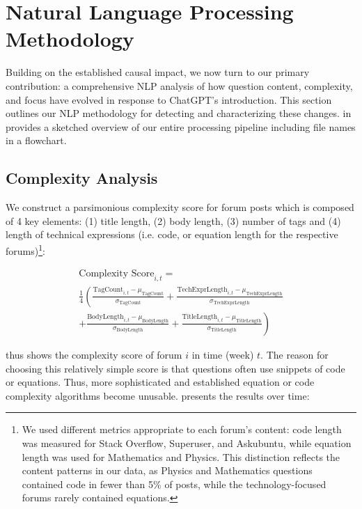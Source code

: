 \section{Natural Language Processing Methodology}
\label{sec:nlp_methodology}

Building on the established causal impact, we now turn to our primary contribution: a comprehensive NLP analysis of how question content, complexity, and focus have evolved in response to ChatGPT's introduction. This section outlines our NLP methodology for detecting and characterizing these changes.  in  provides a sketched overview of our entire processing pipeline including file names in a flowchart.


\subsection{Complexity Analysis}

We construct a parsimonious complexity score for forum posts which is composed of 4 key elements: (1) title length, (2) body length, (3) number of tags and (4) length of technical expressions (i.e. code, or equation length for the respective forums)\footnote{We used different metrics appropriate to each forum's content: code length was measured for Stack Overflow, Superuser, and Askubuntu, while equation length was used for Mathematics and Physics. This distinction reflects the content patterns in our data, as Physics and Mathematics questions contained code in fewer than 5\% of posts, while the technology-focused forums rarely contained equations.}:

\begin{multline}\label{eq:cscore}
    \text{Complexity Score}_{i,t} = \\ 
    \frac{1}{4} \left( \frac{\text{TagCount}_{i,t} - \mu_{\text{TagCount}}}{\sigma_{\text{TagCount}}} + \frac{\text{TechExprLength}_{i,t} - \mu_{\text{TechExprLength}}}{\sigma_{\text{TechExprLength}}} \right. \\
    \left. + \frac{\text{BodyLength}_{i,t} - \mu_{\text{BodyLength}}}{\sigma_{\text{BodyLength}}} + \frac{\text{TitleLength}_{i,t} - \mu_{\text{TitleLength}}}{\sigma_{\text{TitleLength}}} \right)
\end{multline}

 thus shows the complexity score of forum $i$ in time (week) $t$. The reason for choosing this relatively simple score is that questions often use snippets of code or equations. Thus, more sophisticated and established equation or code complexity algorithms become unusable.  presents the results over time:

